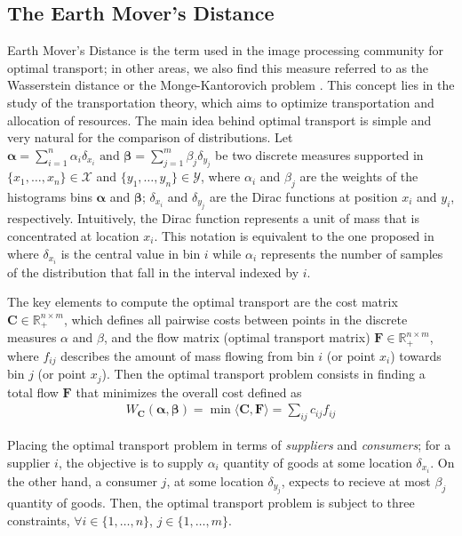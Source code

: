 \subsection{The Earth Mover's Distance}\label{subsec:EMD}
Earth Mover's Distance is the term used in the image processing community for optimal transport; in other areas, we also find this measure referred to as the Wasserstein distance \citep{Gibbs.Su:ISR:2002} or the Monge-Kantorovich problem \citep{Bogachev.Kolesnikov:RMS:2012, Kantorovich:JMS:2006}. This concept lies in the study of the transportation theory, which aims to optimize transportation and allocation of resources. The main idea behind optimal transport is simple and very natural for the comparison of distributions. 
Let
$
\boldsymbol{\alpha} = \sum_{i=1}^{n}\alpha_{i}\delta_{x_i} \text{  and  } \boldsymbol{\beta} = \sum_{j=1}^{m}\beta_{j}\delta_{y_j}
$
be two discrete measures supported in $\{x_1, \ldots, x_n\} \in \mathcal{X}$ and $\{y_1, \ldots, y_n\} \in \mathcal{Y}$, where $\alpha_i$ and $\beta_j$ are the weights of the histograms bins $\boldsymbol{\alpha}$ and $\boldsymbol{\beta}$; $\delta_{x_i}$ and $\delta_{y_j}$ are the Dirac functions at position $x_i$ and $y_i$, respectively. Intuitively, the Dirac function represents a unit of mass that is concentrated at location $x_i$. This notation is equivalent to the one proposed in \citep{Rubner.Tomasi.ea:IJCV:2000} where $\delta_{x_i}$ is the central value in bin $i$ while $\alpha_i$ represents the number of samples of the distribution that fall in the interval indexed by $i$.

The key elements to compute the optimal transport are the cost matrix $\mathbf{C} \in \mathbb{R}^{n\times m}_+$, which defines all pairwise costs between points in the discrete measures $\alpha$ and $\beta$, and the flow matrix (optimal transport matrix) $\mathbf{F} \in \mathbb{R}^{n\times m}_+$, where $f_{ij}$ describes the amount of mass flowing from bin $i$ (or point $x_i$) towards bin $j$ (or point $x_j$). Then the optimal transport problem consists in finding a total flow $\mathbf{F}$ that minimizes the overall cost defined as
\begin{eqnarray}
W_{\mathbf{C}}(\boldsymbol{\alpha}, \boldsymbol{\beta}) = \min \langle\mathbf{C},\mathbf{F}\rangle = \sum\nolimits_{ij} c_{ij}f_{ij}
\label{eq:optimal_work}
\end{eqnarray}

Placing the optimal transport problem in terms of \textit{suppliers} and \textit{consumers}; for a supplier $i$, the objective is to supply $\alpha_i$ quantity of goods at some location $\delta_{x_i}$. On the other hand, a consumer $j$, at some location $\delta_{y_j}$, expects to recieve at most $\beta_j$ quantity of goods. Then, the optimal transport problem is subject to three constraints, $\forall i \in\{1, \ldots, n\}$, $j \in\{1, \ldots, m\}$.

